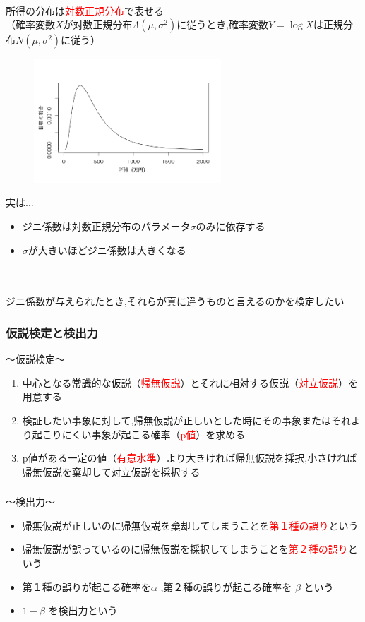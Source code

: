 \documentclass[dvipdfmx,14pt]{beamer}
\begin{document}
\begin{frame}
\ \\
所得の分布は\textcolor{red}{対数正規分布}で表せる \\
（確率変数$X$が対数正規分布$ \Lambda (\mu ,\sigma^2 ) $に従うとき,確率変数$ Y=\log X$は正規分布$ N(\mu ,\sigma^2 )$に従う）
\begin{figure}
\includegraphics[width=7cm]{curve1}
\end{figure}
\end{frame}

\begin{frame}
実は...
\begin{itemize}
\item ジニ係数は対数正規分布のパラメータ$ \sigma $のみに依存する
\item $ \sigma $が大きいほどジニ係数は大きくなる
\end{itemize}
\ \\ \ \\
\large ジニ係数が与えられたとき,それらが真に違うものと言えるのかを検定したい
\end{frame}

\begin{frame}
\frametitle{仮説検定と検出力}
{\Large ～仮説検定～}
\begin{enumerate}
 \item 中心となる常識的な仮説（\textcolor{red}{帰無仮説}）とそれに相対する仮説（\textcolor{red}{対立仮説}）を用意する
 \item 検証したい事象に対して,帰無仮説が正しいとした時にその事象またはそれより起こりにくい事象が起こる確率（\textcolor{red}{p値}）を求める
 \item p値がある一定の値（\textcolor{red}{有意水準}）より大きければ帰無仮説を採択,小さければ帰無仮説を棄却して対立仮説を採択する
\end{enumerate}
\end{frame}

\begin{frame}
\frametitle{}
{\Large ～検出力～}
\begin{itemize}
 \item 帰無仮説が正しいのに帰無仮説を棄却してしまうことを\textcolor{red}{第１種の誤り}という
 \item 帰無仮説が誤っているのに帰無仮説を採択してしまうことを\textcolor{red}{第２種の誤り}という
 \item 第１種の誤りが起こる確率を$ \alpha $ ,第２種の誤りが起こる確率を $ \beta $ という
 \item $ 1-\beta $ を検出力という
\end{itemize}
\end{frame}
\end{document}
